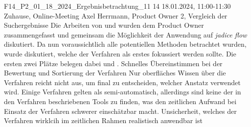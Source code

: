 \fieldnote
{F14\_P2\_01\_18\_2024\_Ergebnisbetrachtung\_11}
{14}
{18.01.2024, 11:00-11:30}
{Zuhause, Online-Meeting}
{Axel Herrmann, Product Owner}
{2, Vergleich der Suchergebnisse}
{
  Die Arbeiten von  und  wurden dem Product Owner zusammengefasst und gemeinsam die Möglichkeit der Anwendung auf \emph{jadice flow} diskutiert.
  Da nun voraussichtlich alle potentiellen Methoden betrachtet wurden, wurde diskutiert, welche der Verfahren als erstes fokussiert werden sollte.
  Die ersten zwei Plätze belegen dabei  und .
}
{
}
{
  Schnelles Übereinstimmen bei der Bewertung und Sortierung der Verfahren
}
{
  Nur oberfläches Wissen über die Verfahren reicht nicht aus, um final zu entscheiden, welcher Anstatz verwendet wird.
  Einige Verfahren gelten als semi-automatisch, allerdings sind keine der in den Verfahren beschriebenen Tools zu finden, was den zeitlichen Aufwand bei Einsatz der Verfahren schwerer einschätzbar macht.
}
{
  Unsicherheit, welches der Verfahren wirklcih im zeitlichen Rahmen realistisch anwendbar ist
}
